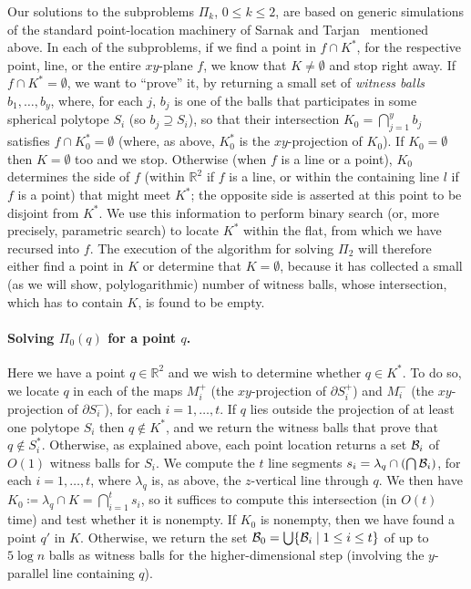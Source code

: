 \documentclass[a4paper,12pt]{article}
\def\B{{\cal B}}
\def\bd{{\partial}}
\begin{document}
Our solutions to the subproblems $\Pi_k$, $0\leq k\leq 2$, are based
on generic simulations of the standard point-location machinery of
Sarnak and Tarjan~\cite{ST} mentioned above. In each of the
subproblems, if we find a point in $f \cap K^*$, for the respective
point, line, or the entire $xy$-plane $f$, we know that $K \neq
\emptyset$ and stop right away. If $f \cap K^* = \emptyset$, we want
to ``prove'' it, by returning a small set of \emph{witness balls}
$b_1,\ldots,b_y$, where, for each $j$, $b_j$ is one of the balls
that participates in some spherical polytope $S_i$ (so $b_j
\supseteq S_i$), so that their intersection $K_0 = \bigcap_{j=1}^y
b_j$ satisfies $f \cap K_0^* = \emptyset$ (where, as above, $K_0^*$
is the $xy$-projection of $K_0$). If $K_0 = \emptyset$ then $K =
\emptyset$ too and we stop. Otherwise (when $f$ is a line or a
point), $K_0$ determines the side of $f$ (within $\mathbb{R}^2$ if
$f$ is a line, or within the containing line $l$ if $f$ is a point)
that might meet $K^*$; the opposite side is asserted at this point
to be disjoint from $K^*$. We use this information to perform binary
search (or, more precisely, parametric search) to locate $K^*$
within the flat, from which we have recursed into $f$.  The
execution of the algorithm for solving $\Pi_2$ will therefore either
find a point in $K$ or determine that $K = \emptyset$, because it
has collected a small (as we will show, polylogarithmic) number of
witness balls, whose intersection, which has to contain $K$, is
found to be empty.

\paragraph{Solving $\Pi _0(q)$ for a point $q$.}
\label{subsec:Pi_0}
Here we have a point $q \in \mathbb{R}^2$ and we wish to determine
whether $q \in K^*$. To do so, we locate $q$ in each of the maps
$M_i^+$ (the $xy$-projection of $\bd S_i^+$) and $M_i^-$ (the
$xy$-projection of $\bd S_i^-$), for each $i=1,\ldots,t$. If $q$
lies outside the projection of at least one polytope $S_i$ then $q
\notin K^*$, and we return the witness balls that prove that $q
\notin S_i^*$. Otherwise, as explained above, each point location
returns a set $\B_i$ of $O(1)$ witness balls for $S_i$. We compute
the $t$ line segments $s_i = \lambda_q \cap (\bigcap\B_i)$, for each
$i = 1,\ldots,t$, where $\lambda_q$ is, as above, the $z$-vertical
line through $q$. We then have $K_0 \coloneqq \lambda_q \cap K =
\bigcap_{i=1}^t s_i$, so it suffices to compute this intersection
(in $O(t)$ time) and test whether it is nonempty. If $K_0$ is
nonempty, then we have found a point $q'$ in $K$. Otherwise, we
return the set $\B_0 = \bigcup \{\B_i \mid 1 \leq i \leq t\}$ of up
to $5 \log n$ balls as witness balls for the higher-dimensional step
(involving the $y$-parallel line containing $q$).
\end{document}
